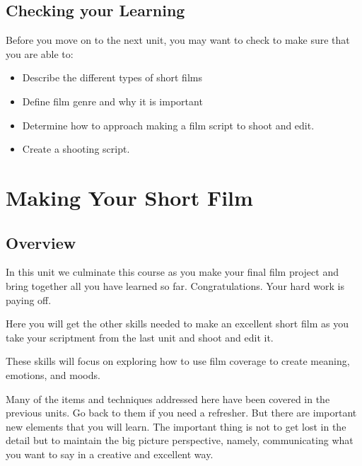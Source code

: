 \documentclass[
]{book}
\providecommand{\tightlist}{%
  \setlength{\itemsep}{0pt}\setlength{\parskip}{0pt}}
\begin{document}
\hypertarget{checking-your-learning-7}{%
\section*{Checking your Learning}\label{checking-your-learning-7}}

\begin{progress}
Before you move on to the next unit, you may want to check to make sure that you are able to:

\begin{itemize}
\tightlist
\item
  Describe the different types of short films\\
\item
  Define film genre and why it is important\\
\item
  Determine how to approach making a film script to shoot and edit.\\
\item
  Create a shooting script.
\end{itemize}
\end{progress}

\hypertarget{making-your-short-film}{%
\chapter{Making Your Short Film}\label{making-your-short-film}}

\hypertarget{overview-8}{%
\section*{Overview}\label{overview-8}}

In this unit we culminate this course as you make your final film project and bring together all you have learned so far. Congratulations. Your hard work is paying off.

Here you will get the other skills needed to make an excellent short film as you take your scriptment from the last unit and shoot and edit it.

These skills will focus on exploring how to use film coverage to create meaning, emotions, and moods.

Many of the items and techniques addressed here have been covered in the previous units. Go back to them if you need a refresher. But there are important new elements that you will learn. The important thing is not to get lost in the detail but to maintain the big picture perspective, namely, communicating what you want to say in a creative and excellent way.
\end{document}
